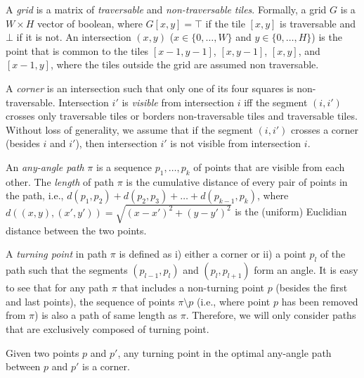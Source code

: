 A \emph{grid} is a matrix 
of \emph{traversable} and \emph{non-traversable} \emph{tiles}.  
Formally, a grid $G$ is a $W \times H$ vector of boolean, 
where $G[x,y] = \top$ if the tile $[x,y]$ is traversable 
and $\bot$ if it is not.  
An intersection $(x,y)$ ($x \in \{0,\dots,W\}$ and $y \in \{0,\dots,H\}$) 
is the point that is common to the tiles 
$[x-1,y-1]$, $[x,y-1]$, $[x,y]$, and $[x-1,y]$, 
where the tiles outside the grid are assumed non traversable.  

A \emph{corner} is an intersection 
such that only one of its four squares is non-traversable.  
Intersection $i'$ is \emph{visible} from intersection $i$ 
iff the segment $(i,i')$ crosses only traversable tiles 
or borders non-traversable tiles and traversable tiles.  
Without loss of generality, 
we assume that if the segment $(i,i')$ crosses a corner 
(besides $i$ and $i'$), 
then intersection $i'$ is not visible from intersection $i$.  

An \emph{any-angle path} $\pi$ is a sequence $p_1,\dots,p_k$ 
of points that are visible from each other.  
The \emph{length} of path $\pi$ 
is the cumulative distance of every pair of points in the path, 
i.e., $d(p_1,p_2) + d(p_2,p_3) + \dots + d(p_{k-1},p_k)$, 
where $d((x,y),(x',y')) = \sqrt{(x-x')^2 + (y-y')^2}$ 
is the (uniform) Euclidian distance between the two points.  

A \emph{turning point} in path $\pi$ 
is defined as i) either a corner 
or ii) a point $p_l$ of the path 
such that the segments $(p_{l-1},p_l)$ and $(p_l,p_{l+1})$ form an angle.  
It is easy to see that for any path $\pi$ 
that includes a non-turning point $p$ 
(besides the first and last points), 
the sequence of points $\pi \setminus p$ 
(i.e., where point $p$ has been removed from $\pi$) 
is also a path of same length as $\pi$.  
Therefore, we will only consider paths 
that are exclusively composed of turning point.  

\begin{lemm}
  Given two points $p$ and $p'$, 
  any turning point in the optimal any-angle path between $p$ and $p'$ 
  is a corner.  
\end{lemm}

